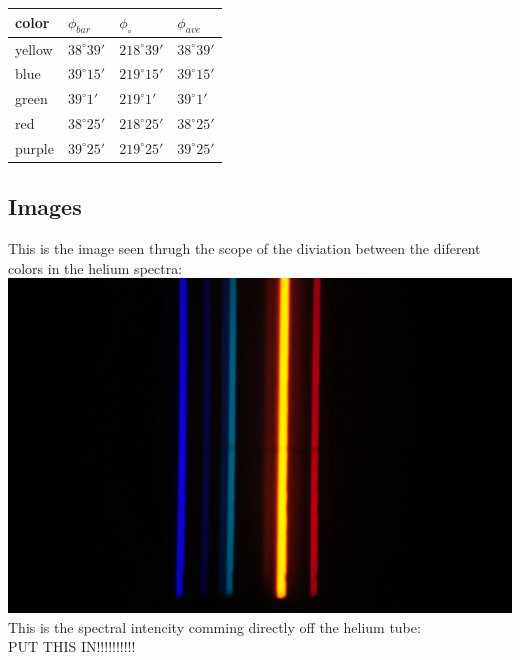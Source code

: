 \documentclass[12pt,a4paper]{article}
\begin{document}
\begin{tabular}{| l | l | l | l |}
\hline
color & $\phi_{bar}$ & $\phi_\circ$ & $\phi_{ave}$\\
\hline
yellow & $38^\circ 39'$ & $218^\circ 39'$ & $38^\circ 39'$\\
\hline
blue & $39^\circ 15'$ & $219^\circ 15'$ & $39^\circ 15'$\\
\hline
green & $39^\circ 1'$ & $219^\circ 1'$ & $39^\circ 1'$\\
\hline
red & $38^\circ 25'$ & $218^\circ 25'$ & $38^\circ 25'$\\
\hline
purple & $39^\circ 25'$ & $219^\circ 25'$ & $39^\circ 25'$\\
\hline


\end{tabular}
\subsection{Images}
This is the image seen thrugh the scope of the diviation between the diferent colors in the helium spectra:\\
\includegraphics[scale=.3]{hspec}\\
This is the spectral intencity comming directly off the helium tube:\\
PUT THIS IN!!!!!!!!!!
\end{document}
